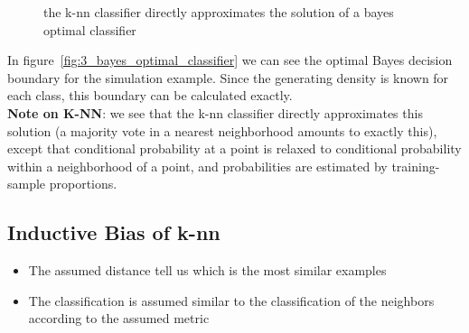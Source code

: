 \documentclass[../main.tex]{subfiles}
\begin{document}
\begin{figure}[H]
  \centering
  \hfill
  \caption{the k-nn classifier directly approximates the solution of a bayes optimal classifier}
\end{figure}

In figure~\ref{fig:3_bayes_optimal_classifier} we can see the optimal Bayes decision boundary for the simulation example. Since the generating density is known for each class, this boundary can be calculated exactly.\\


\textbf{Note on K-NN}: we see that the k-nn classifier directly approximates this solution (a majority vote in a nearest neighborhood amounts to exactly this), except that conditional probability at a point is relaxed to conditional probability within a neighborhood of a point, and probabilities are estimated by training-sample proportions.

\subsection{Inductive Bias of k-nn}
\begin{itemize}
    \item The assumed distance tell us which is the most similar examples
    \item The classification is assumed similar to the classification of the neighbors according to the assumed metric
\end{itemize}
\end{document}
